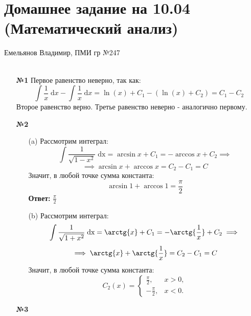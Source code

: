 \documentclass[a4paper]{article}
\renewcommand{\f}[2]{\frac{#1}{#2}}
\renewcommand{\d}{\;\text{d}}
\newcommand{\dx}{\;\text{dx}}
\begin{document}
\section*{Домашнее задание на 10.04 (Математический анализ)}
 {\large Емельянов Владимир, ПМИ гр №247}\\\\
\begin{enumerate}
    \item[\textbf{№1}]Первое равенство неверно, так как:
    $$\int \f{1}{x} \d x - \int \f{1}{x} \d x= \ln(x) + C_1 - (\ln(x) + C_2) = C_1 - C_2$$
    Второе равенство верно. Третье равенство неверно - аналогично первому.

    \item[\textbf{№2}]\begin{enumerate}
        \item[(a)]Рассмотрим интеграл:
        $$\int \f{1}{\sqrt{1-x^2}} \dx = \arcsin{x} + C_1 = -\arccos{x} + C_2 \implies$$
        $$\implies \arcsin{x} + \arccos{x} = C_2 - C_1 = C$$
        Значит, в любой точке сумма константа:
        $$\arcsin{1} + \arccos{1} = \f{\pi}{2}$$
        \textbf{Ответ:} $\f{\pi}{2}$

        \item[(b)]Рассмотрим интеграл:
        $$\int \f{1}{\sqrt{1+x^2}} \dx = \arctg{x} + C_1 = -\arctg{\f{1}{x}} + C_2 \implies$$
        $$\implies \arctg{x} + \arctg{\f{1}{x}} = C_2 - C_1 = C$$
        Значит, в любой точке сумма константа:
        $$C_2(x) = \begin{cases} 
            \frac{\pi}{2}, & x > 0, \\
            -\frac{\pi}{2}, & x < 0.
        \end{cases}$$
    \end{enumerate}


    \item[\textbf{№3}]
\end{enumerate}
\end{document}
